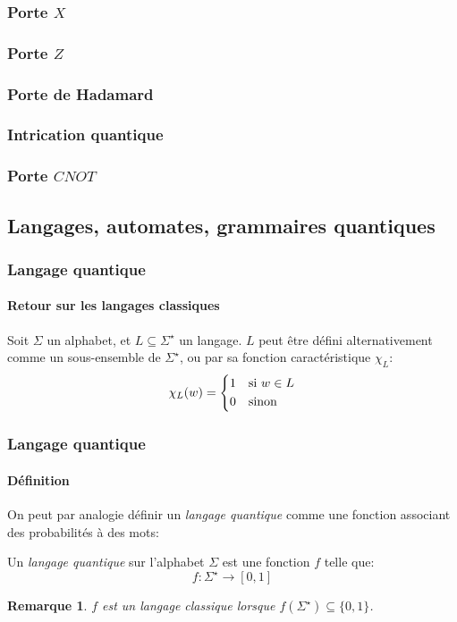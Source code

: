 \documentclass[aspectratio=169]{beamer}
\theoremstyle{plain}
\newtheorem*{remark}{Remarque}
\theoremstyle{definition}
\begin{document}
\begin{frame}
    \frametitle{Porte $X$}
\end{frame}

\begin{frame}
    \frametitle{Porte $Z$}
\end{frame}

\begin{frame}
    \frametitle{Porte de Hadamard}
\end{frame}

\begin{frame}
    \frametitle{Intrication quantique}
\end{frame}

\begin{frame}
    \frametitle{Porte $CNOT$}
\end{frame}

\subsection{Langages, automates, grammaires quantiques}
\begin{frame}
    \frametitle{Langage quantique}
    \framesubtitle{Retour sur les langages classiques}
    Soit $\Sigma$ un alphabet, et $L\subseteq \Sigma^\star$ un langage. $L$ peut être défini alternativement comme un sous-ensemble de $\Sigma^\star$, ou par sa fonction caractéristique $\chi_L$:
    \begin{equation*}
        \chi_L(w) = \begin{cases*}
            1 & si $w\in L$\\
            0 & sinon
        \end{cases*}
    \end{equation*}
\end{frame}

\begin{frame}
    \frametitle{Langage quantique}
    \framesubtitle{Définition}
    On peut par analogie définir un \emph{langage quantique} comme une fonction associant des probabilités à des mots:
    \begin{definition}
        Un \emph{langage quantique} sur l'alphabet $\Sigma$ est une fonction $f$ telle que:
        \begin{equation*}
            f : \Sigma^\star \to [0, 1]
        \end{equation*}
        
    \end{definition}

    \begin{remark}
        $f$ est un langage classique lorsque $f(\Sigma^\star) \subseteq \{0, 1\}$.
    \end{remark}
\end{frame}
\end{document}
